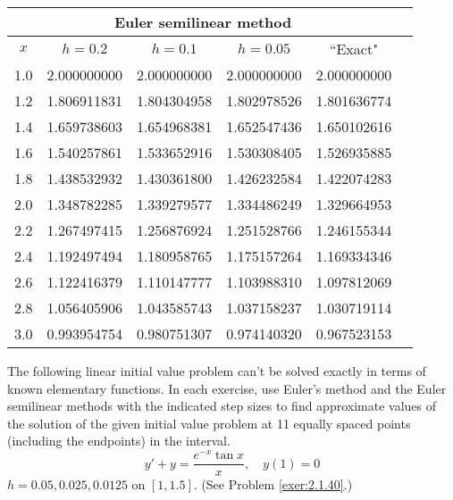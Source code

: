 \documentclass{ximera}
\begin{document}
\begin{problem}
\begin{solution}
{\small
\begin{tabular}{|c|r|r|r|r|r|}
\hline
\multicolumn{5}{|c|}{Euler semilinear method}\\\hline
\multicolumn{1}{|c|}{$x$}&
\multicolumn{1}{|c|}{$h=0.2$}&
\multicolumn{1}{|c|}{$h=0.1$}&
\multicolumn{1}{|c|}{$h=0.05$}&
\multicolumn{1}{|c|}{``Exact"}\\ \hline
1.0 & 2.000000000 & 2.000000000 & 2.000000000 & 2.000000000 \\
1.2 & 1.806911831 & 1.804304958 & 1.802978526 & 1.801636774 \\
1.4 & 1.659738603 & 1.654968381 & 1.652547436 & 1.650102616 \\
1.6 & 1.540257861 & 1.533652916 & 1.530308405 & 1.526935885 \\
1.8 & 1.438532932 & 1.430361800 & 1.426232584 & 1.422074283 \\
2.0 & 1.348782285 & 1.339279577 & 1.334486249 & 1.329664953 \\
2.2 & 1.267497415 & 1.256876924 & 1.251528766 & 1.246155344 \\
2.4 & 1.192497494 & 1.180958765 & 1.175157264 & 1.169334346 \\
2.6 & 1.122416379 & 1.110147777 & 1.103988310 & 1.097812069 \\
2.8 & 1.056405906 & 1.043585743 & 1.037158237 & 1.030719114 \\
3.0 & 0.993954754 & 0.980751307 & 0.974140320 & 0.967523153 \\
\hline
\end{tabular}}

\end{solution}
\end{problem}

\begin{problem}\label{exer:3.1.17} The following linear initial value problem can't be solved exactly in terms of known elementary functions. In each exercise, use
Euler's method and the Euler semilinear methods
with the indicated step sizes to find approximate values of the
solution of the given initial value problem at 11 equally spaced
points (including the endpoints) in the interval.
$$y'+y=\frac{e^{-x}\tan x}{x},\quad y(1)=0$$
$h=0.05,0.025,0.0125$ on $[1,1.5]$. (See Problem \ref{exer:2.1.40}.)
\end{problem}
\end{document}
